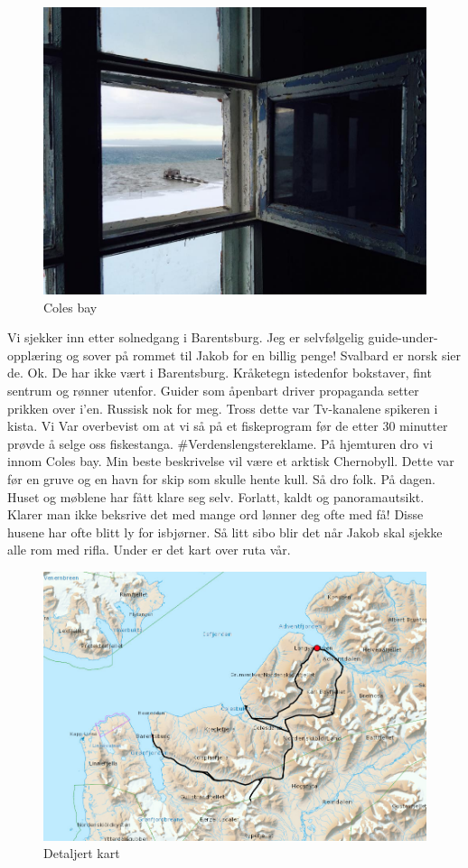 \begin{figure}[!h]
	\centering
	\includegraphics[width=\textwidth]{Colesbay}
	\caption{Coles bay}
\label{fig:tilbarentsburg}
\end{figure}

Vi sjekker inn etter solnedgang i Barentsburg. Jeg er selvfølgelig
guide-under-opplæring
og sover på rommet til Jakob for en billig penge! Svalbard er norsk
sier de. Ok. De har ikke vært i Barentsburg. Kråketegn istedenfor
bokstaver, fint sentrum og rønner utenfor. Guider som åpenbart driver
propaganda setter prikken over i'en. Russisk nok for meg. Tross dette var Tv-kanalene spikeren
i kista. Vi Var overbevist om at
vi så på et fiskeprogram før de etter 30 minutter prøvde å selge oss
fiskestanga. \#Verdenslengstereklame. På hjemturen dro vi innom Coles
bay. Min beste beskrivelse vil være et arktisk
Chernobyll. Dette var før en gruve og en havn for skip som skulle
 hente kull. Så dro folk. På dagen. Huset og møblene har
fått klare seg selv. Forlatt, kaldt og panoramautsikt. Klarer man ikke
beksrive det med mange ord lønner deg ofte med få! Disse husene har
ofte blitt ly for isbjørner. Så litt sibo blir det når Jakob skal
sjekke alle rom med rifla. Under er det kart over ruta vår. 

\begin{figure}[h!]
\centering
\includegraphics[scale=0.22]{Turbarentsburgliten}
\caption{Detaljert kart}
\label{fig:barentsburgturliten}
\end{figure}

